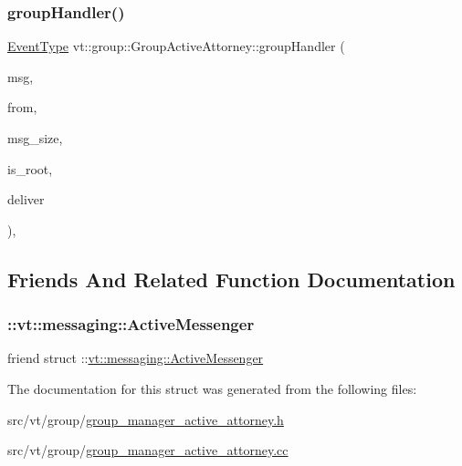 \subsubsection{\texorpdfstring{group\+Handler()}{groupHandler()}}
{\footnotesize\ttfamily \hyperlink{namespacevt_a009267401def7ae8bf201892222d060f}{Event\+Type} vt\+::group\+::\+Group\+Active\+Attorney\+::group\+Handler (\begin{DoxyParamCaption}\item[{\hyperlink{namespacevt_ab2b3d506ec8e8d1540aede826d84a239}{Msg\+Shared\+Ptr}$<$ \hyperlink{namespacevt_a44d0d4e144748f2b19a1cfd962f50338}{Base\+Msg\+Type} $>$ const \&}]{msg,  }\item[{\hyperlink{namespacevt_a866da9d0efc19c0a1ce79e9e492f47e2}{Node\+Type} const \&}]{from,  }\item[{\hyperlink{namespacevt_abfa009d900299ac1df967b40ea8f2c8a}{Msg\+Size\+Type} const \&}]{msg\+\_\+size,  }\item[{bool const}]{is\+\_\+root,  }\item[{bool $\ast$const}]{deliver }\end{DoxyParamCaption})\hspace{0.3cm}{\ttfamily [static]}, {\ttfamily [private]}}



\subsection{Friends And Related Function Documentation}
\mbox{\label{structvt_1_1group_1_1_group_active_attorney_a31cb499e12b002c0912506ddca0efcaa}} 
\subsubsection{\texorpdfstring{\+::vt\+::messaging\+::\+Active\+Messenger}{::vt::messaging::ActiveMessenger}}
{\footnotesize\ttfamily friend struct \+::\hyperlink{structvt_1_1messaging_1_1_active_messenger}{vt\+::messaging\+::\+Active\+Messenger}\hspace{0.3cm}{\ttfamily [friend]}}



The documentation for this struct was generated from the following files\+:\begin{DoxyCompactItemize}
\item 
src/vt/group/\hyperlink{group__manager__active__attorney_8h}{group\+\_\+manager\+\_\+active\+\_\+attorney.\+h}\item 
src/vt/group/\hyperlink{group__manager__active__attorney_8cc}{group\+\_\+manager\+\_\+active\+\_\+attorney.\+cc}\end{DoxyCompactItemize}
